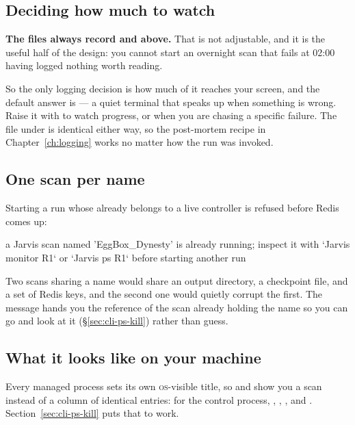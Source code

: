 \subsection{Deciding how much to watch}
\label{sec:cli-logging-flags}

\textbf{The files always record  and above.} That is not adjustable, and it is
the useful half of the design: you cannot start an overnight scan that fails at 02:00
having logged nothing worth reading.

So the only logging decision is how much of it reaches your screen, and the default answer
is  --- a quiet terminal that speaks up when something is wrong. Raise it
with  to watch progress, or  when you are chasing a
specific failure. The file under  is identical either way, so the
post-mortem recipe in Chapter~\ref{ch:logging} works no matter how the run was invoked.

\subsection{One scan per name}

Starting a run whose  already belongs to a live controller is refused
before Redis comes up:

\begin{terminal}
\begin{jout}
a Jarvis scan named 'EggBox_Dynesty' is already running; inspect it with
`Jarvis monitor R1` or `Jarvis ps R1` before starting another run
\end{jout}
\end{terminal}

Two scans sharing a name would share an output directory, a checkpoint file, and a set of
Redis keys, and the second one would quietly corrupt the first. The message hands you the
reference of the scan already holding the name so you can go and look at it
(\S\ref{sec:cli-ps-kill}) rather than guess.

\subsection{What it looks like on your machine}

Every managed process sets its own \textsc{os}-visible title, so  and 
show you a scan instead of a column of identical  entries:
 for the control process,
,
, ,
and . Section~\ref{sec:cli-ps-kill} puts that to
work.

